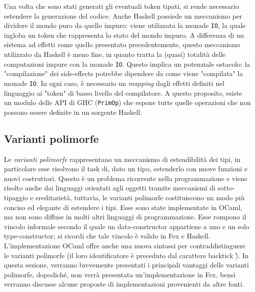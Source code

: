 \documentclass[10pt,a4paper]{article}
\begin{document}
Una volta che sono stati generati gli eventuali token tipati, si rende necessario estendere la generazione del codice.
Anche Haskell possiede un meccanismo per dividere il mondo puro da quello impuro: viene utilizzata la monade \texttt{IO},
la quale ingloba un token che rappresenta lo stato del mondo impuro. A differenza di un sistema ad effetti come quello
presentato precedentemente, questo meccanismo utilizzato da Haskell è meno fine, in quanto tratta la (quasi) totalità
delle computazioni impure con la monade \texttt{IO}. Questo implica un potenziale ostacolo: la "compilazione" dei
side-effects potrebbe dipendere da come viene "compilata" la monade \texttt{IO}. In ogni caso, è necessario un
\textit{mapping}
dagli effetti definiti nel linguaggio ai "token" di basso livello del compilatore. A questo proposito, esiste un
modulo delle API di GHC (\texttt{PrimOp}) che espone tutte quelle operazioni che non possono essere definite in un
sorgente Haskell.

\subsection{Varianti polimorfe}
Le \textit{varianti polimorfe} rappresentano un meccanismo di estendibilità dei tipi, in particolare esse risolvono
il task di, dato un tipo, estenderlo con nuove funzioni e nuovi costruttori. Questo è un problema ricorrente nella
programmazione e viene risolto anche dai linguaggi orientati agli oggetti tramite meccanismi di sotto-tipaggio e
ereditarietà, tuttavia, le varianti polimorfe costituiscono un modo più conciso ed elegante di estendere i tipi.
Esse sono state implementate in OCaml, ma non sono diffuse in molti altri linguaggi di programmazione. Esse rompono
il vincolo informale secondo il quale un data-constructor appartiene a uno e un solo type-constructor; si ricordi che
tale vincolo è valido in Fex e Haskell. L'implementazione OCaml offre anche una nuova sintassi per contraddistinguere
le varianti polimorfe (il loro identificatore è preceduto dal carattere backtick \`).
In questa sezione, verranno brevemente presentati i principali vantaggi delle varianti polimorfe, dopodiché, non verrà
presentata un'implementazione in Fex, bensì verranno discusse alcune proposte di implementazioni provenienti da
altre fonti.
\end{document}

